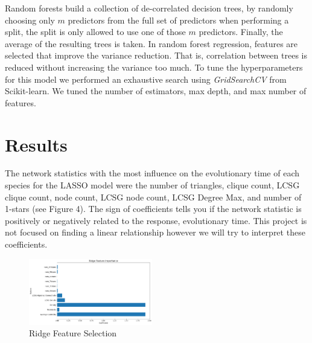 \documentclass[12pt]{article}
\begin{document}
Random forests build a collection of de-correlated decision trees, by randomly choosing only $m$ predictors from the full set of predictors when performing a split, the split is only allowed to use one of those $m$ predictors. Finally, the average of the resulting trees is taken. In random forest regression, features are selected that improve the variance reduction. That is, correlation between trees is reduced without increasing the variance too much. To tune the hyperparameters for this model we performed an exhaustive search using \textit{GridSearchCV} from Scikit-learn. We tuned the number of estimators, max depth, and max number of features. 

\section{Results}
The network statistics with the most influence on the evolutionary time of each species for the LASSO model were the number of triangles, clique count, LCSG clique count, node count, LCSG node count, LCSG Degree Max, and number of 1-stars (see Figure 4). The sign of coefficients tells you if the network statistic is positively or negatively related to the response, evolutionary time. This project is not focused on finding a linear relationship however we will try to interpret these coefficients.
\begin{figure}
  \vspace{-20pt}
  \begin{center}
    \includegraphics[width=0.48\textwidth]{PPIN_fig3}
  \end{center}
  \vspace{-20pt}
  \caption{Ridge Feature Selection}
  \vspace{-10pt}
\end{figure}
\end{document}
